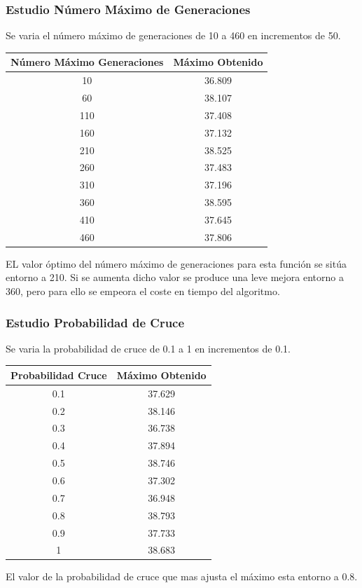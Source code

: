 \documentclass[12pt]{article}
\begin{document}
\subsubsection*{Estudio Número Máximo de Generaciones}
	Se varia el número máximo de generaciones de 10 a 460 en incrementos de 50.
\begin{table}[H]
\begin{center}
\begin{tabular}{|cc|} \hline
Número Máximo Generaciones & Máximo Obtenido \\  \hline
10  & 36.809 \\ 
60  & 38.107 \\ 
110 & 37.408 \\
160 & 37.132 \\
210 & 38.525 \\
260 & 37.483 \\
310 & 37.196 \\
360 & 38.595 \\ 
410 & 37.645 \\
460 & 37.806 \\  \hline
\end{tabular}
\end{center}
\end{table}
	EL valor óptimo del número máximo de generaciones para esta función se sitúa entorno a 210. Si se aumenta dicho valor se produce una leve mejora entorno a 360, pero para ello se empeora el coste en tiempo del algoritmo.

\subsubsection*{Estudio Probabilidad de Cruce}
	Se varia la probabilidad de cruce de 0.1 a 1 en incrementos de 0.1.
\begin{table}[H]
\begin{center}
\begin{tabular}{|cc|} \hline
Probabilidad Cruce & Máximo Obtenido \\  \hline
0.1 & 37.629 \\ 
0.2 & 38.146 \\ 
0.3 & 36.738 \\
0.4 & 37.894 \\
0.5 & 38.746 \\
0.6 & 37.302 \\
0.7 & 36.948 \\
0.8 & 38.793 \\ 
0.9 & 37.733 \\
1   & 38.683 \\  \hline
\end{tabular}
\end{center}
\end{table}
	El valor de la probabilidad de cruce que mas ajusta el máximo esta entorno a 0.8.
\end{document}

